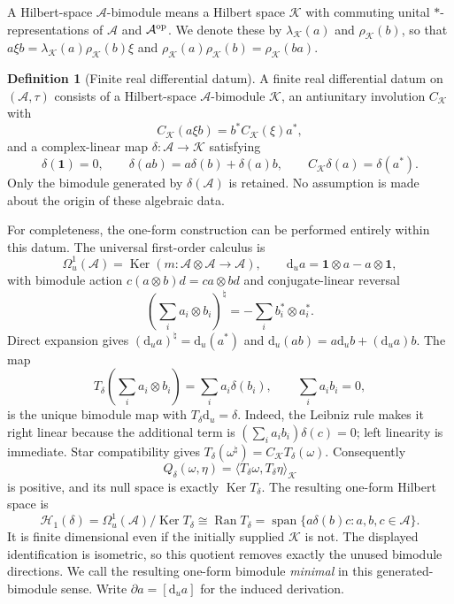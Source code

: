\documentclass[11pt]{article}
\theoremstyle{definition}
\newtheorem{definition}[definition]{Definition}
\theoremstyle{remark}
\theoremstyle{definition}
\theoremstyle{remark}
\newcommand{\one}{\mathbf 1}
\newcommand{\dd}{\mathrm d}
\newcommand{\Ker}{\operatorname{Ker}}
\newcommand{\Ran}{\operatorname{Ran}}
\newcommand{\Span}{\operatorname{span}}
\newcommand{\A}{\mathcal A}
\newcommand{\Hh}{\mathcal H}
\newcommand{\Om}{\Omega}
\begin{document}
A Hilbert-space $\A$-bimodule means a Hilbert space $\mathcal K$ with commuting
unital $*$-representations of $\A$ and $\A^{\rm op}$.  We denote these by
$\lambda_{\mathcal K}(a)$ and $\rho_{\mathcal K}(b)$, so that
$a\xi b=\lambda_{\mathcal K}(a)\rho_{\mathcal K}(b)\xi$ and
$\rho_{\mathcal K}(a)\rho_{\mathcal K}(b)=\rho_{\mathcal K}(ba)$.

\begin{definition}[Finite real differential datum]
\label{def:finite-real-differential}
A finite real differential datum on $(\A,\tau)$ consists of a Hilbert-space
$\A$-bimodule $\mathcal K$, an antiunitary involution $C_{\mathcal K}$ with
\[
 C_{\mathcal K}(a\xi b)=b^*C_{\mathcal K}(\xi)a^*,
\]
and a complex-linear map $\delta:\A\to\mathcal K$ satisfying
\begin{equation}
 \delta(\one)=0,\qquad
 \delta(ab)=a\delta(b)+\delta(a)b,\qquad
 C_{\mathcal K}\delta(a)=\delta(a^*).
 \label{eq:predictive-derivation}
\end{equation}
Only the bimodule generated by $\delta(\A)$ is retained.  No assumption is
made about the origin of these algebraic data.
\end{definition}

For completeness, the one-form construction can be performed entirely within
this datum.  The universal first-order calculus is
\begin{equation}
 \Om_u^1(\A)=\Ker(m:\A\otimes\A\to\A),\qquad
 \dd_u a=\one\otimes a-a\otimes\one,
 \label{eq:universal-oneforms}
\end{equation}
with bimodule action $c(a\otimes b)d=ca\otimes bd$ and conjugate-linear reversal
\begin{equation}
 \left(\sum_i a_i\otimes b_i\right)^\natural
 =-\sum_i b_i^*\otimes a_i^*.
 \label{eq:oneform-reversal}
\end{equation}
Direct expansion gives $(\dd_u a)^\natural=\dd_u(a^*)$ and
$\dd_u(ab)=a\dd_u b+(\dd_u a)b$.
The map
\[
 T_\delta\left(\sum_i a_i\otimes b_i\right)
 =\sum_i a_i\delta(b_i),\qquad \sum_i a_ib_i=0,
\]
is the unique bimodule map with $T_\delta\dd_u=\delta$.  Indeed, the
Leibniz rule makes it right linear because the additional term is
$(\sum_i a_ib_i)\delta(c)=0$; left linearity is immediate.
Star compatibility gives
$T_\delta(\omega^\natural)=C_{\mathcal K}T_\delta(\omega)$.
Consequently
\begin{equation}
 Q_\delta(\omega,\eta)
 =\langle T_\delta\omega,T_\delta\eta\rangle_{\mathcal K}
 \label{eq:differential-Gram}
\end{equation}
is positive, and its null space is exactly $\Ker T_\delta$.  The resulting
one-form Hilbert space is
\begin{equation}
 \Hh_1(\delta)=\Om_u^1(\A)/\Ker T_\delta
 \cong\Ran T_\delta
 =\Span\{a\delta(b)c:a,b,c\in\A\}.
 \label{eq:H1-delta}
\end{equation}
It is finite dimensional even if the initially supplied $\mathcal K$ is not.
The displayed identification is isometric, so this quotient removes exactly
the unused bimodule directions.  We call the resulting one-form bimodule
\emph{minimal} in this generated-bimodule sense.  Write
$\partial a=[\dd_u a]$ for the induced derivation.
\end{document}
